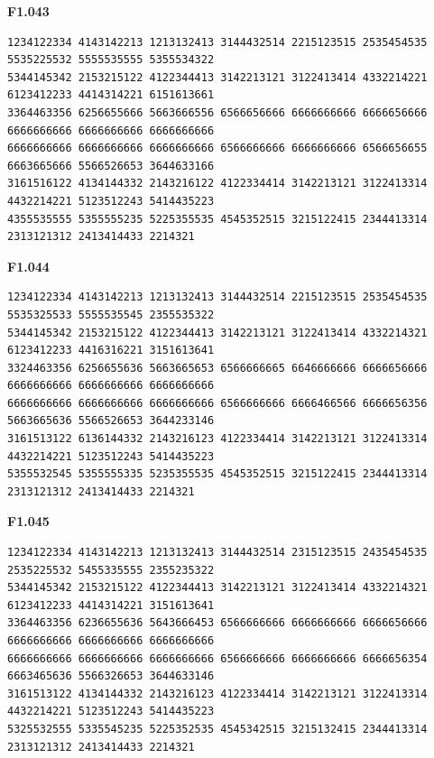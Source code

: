 \noindent\begin{minipage}{\linewidth}\textbf{F1.043}
\begin{lstlisting}
1234122334 4143142213 1213132413 3144432514 2215123515 2535454535 5535225532 5555535555 5355534322
5344145342 2153215122 4122344413 3142213121 3122413414 4332214221 6123412233 4414314221 6151613661
3364463356 6256655666 5663666556 6566656666 6666666666 6666656666 6666666666 6666666666 6666666666
6666666666 6666666666 6666666666 6566666666 6666666666 6566656655 6663665666 5566526653 3644633166
3161516122 4134144332 2143216122 4122334414 3142213121 3122413314 4432214221 5123512243 5414435223
4355535555 5355555235 5225355535 4545352515 3215122415 2344413314 2313121312 2413414433 2214321
\end{lstlisting}
\end{minipage}\par\smallskip

\noindent\begin{minipage}{\linewidth}\textbf{F1.044}
\begin{lstlisting}
1234122334 4143142213 1213132413 3144432514 2215123515 2535454535 5535325533 5555535545 2355535322
5344145342 2153215122 4122344413 3142213121 3122413414 4332214321 6123412233 4416316221 3151613641
3324463356 6256655636 5663665653 6566666665 6646666666 6666656666 6666666666 6666666666 6666666666
6666666666 6666666666 6666666666 6566666666 6666466566 6666656356 5663665636 5566526653 3644233146
3161513122 6136144332 2143216123 4122334414 3142213121 3122413314 4432214221 5123512243 5414435223
5355532545 5355555335 5235355535 4545352515 3215122415 2344413314 2313121312 2413414433 2214321
\end{lstlisting}
\end{minipage}\par\smallskip

\noindent\begin{minipage}{\linewidth}\textbf{F1.045}
\begin{lstlisting}
1234122334 4143142213 1213132413 3144432514 2315123515 2435454535 2535225532 5455335555 2355235322
5344145342 2153215122 4122344413 3142213121 3122413414 4332214321 6123412233 4414314221 3151613641
3364463356 6236655636 5643666453 6566666666 6666666666 6666656666 6666666666 6666666666 6666666666
6666666666 6666666666 6666666666 6566666666 6666666666 6666656354 6663465636 5566326653 3644633146
3161513122 4134144332 2143216123 4122334414 3142213121 3122413314 4432214221 5123512243 5414435223
5325532555 5335545235 5225352535 4545342515 3215132415 2344413314 2313121312 2413414433 2214321
\end{lstlisting}
\end{minipage}\par\smallskip

